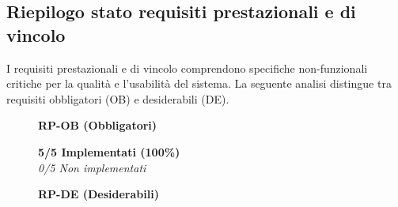 \documentclass[a4paper, 11pt, oneside]{scrartcl}
\begin{document}
\newpage
\subsection{Riepilogo stato requisiti prestazionali e di vincolo}

I requisiti prestazionali e di vincolo comprendono specifiche non-funzionali critiche per la qualità e l'usabilità del sistema. La seguente analisi distingue tra requisiti obbligatori (OB) e desiderabili (DE).

\begin{figure}[H]
    \centering
    \begin{minipage}{0.31\textwidth}
        \centering
        \textbf{RP-OB (Obbligatori)}
        \vspace{0.3cm}
        
        
        \small
        \textbf{\textcolor{blue!80}{5/5 Implementati} (100\%)}\\
        \textit{0/5 Non implementati}
    \end{minipage}
    \hfill
    \begin{minipage}{0.31\textwidth}
        \centering
        \textbf{RP-DE (Desiderabili)}
        \vspace{0.3cm}
        
\end{minipage}
\end{figure}
\end{document}
